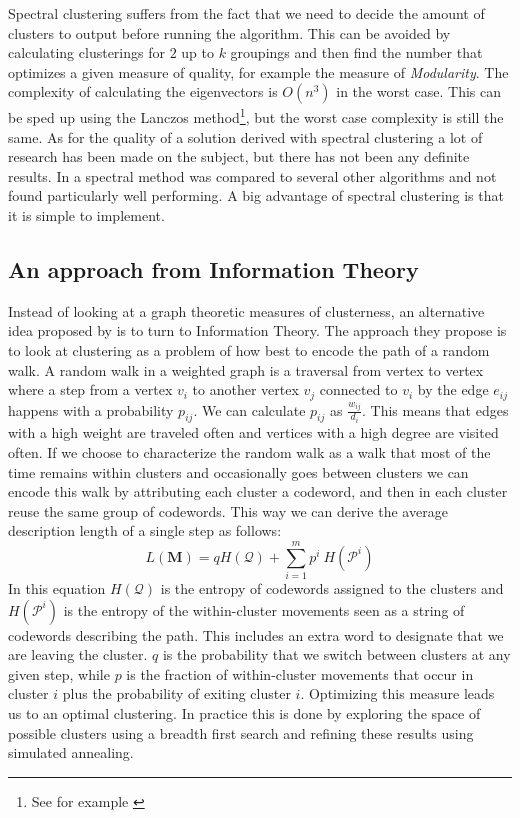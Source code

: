 Spectral clustering suffers from the fact that we need to decide the 
amount of clusters to output before running the algorithm. This can be 
avoided by calculating clusterings for $2$ up to $k$ groupings and then 
find the number that optimizes a given measure of quality, for example 
the measure of \emph{Modularity}. The complexity of calculating the 
eigenvectors is $O(n^3)$ in the worst case. This can be sped up using 
the Lanczos method\footnote{See for example \cite{golub1996}}, but the 
worst case complexity is still the same. As for the quality of a 
solution derived with spectral clustering a lot of research has been 
made on the subject, but there has not been any definite results. In 
\cite{lancichinetti2009} a spectral method was compared to several other 
algorithms and not found particularly well performing.  A big advantage 
of spectral clustering is that it is simple to implement.

\subsection{An approach from Information Theory}
Instead of looking at a graph theoretic measures of clusterness, an 
alternative idea proposed by \cite{rosvall2008} is to turn to 
Information Theory. The approach they propose is to look at clustering 
as a problem of how best to encode the path of a random walk. A random 
walk in a weighted graph is a traversal from vertex to vertex where a 
step from a vertex $v_i$ to another vertex $v_j$ connected to $v_i$ by 
the edge $e_{ij}$ happens with a probability $p_{ij}$. We can calculate 
$p_{ij}$ as $\frac{w_{ij}}{d_i}$. This means that edges with a high 
weight are traveled often and vertices with a high degree are visited 
often. If we choose to characterize the random walk as a walk that most 
of the time remains within clusters and occasionally goes between 
clusters we can encode this walk by attributing each cluster a codeword, 
and then in each cluster reuse the same group of codewords. This way we 
can derive the average description length of a single step as follows:
\begin{equation}
	L(\textbf{M}) = q H(\mathcal{Q}) + \sum_{i=1}^{m} p^i \
	H(\mathcal{P}^i)
\end{equation}
In this equation $H(\mathcal{Q})$ is the entropy of codewords assigned 
to the clusters and $H(\mathcal{P}^i)$ is the entropy of the 
within-cluster movements seen as a string of codewords describing the 
path. This includes an extra word to designate that we are leaving the 
cluster. $q$ is the probability that we switch between clusters at any 
given step, while $p$ is the fraction of within-cluster movements that 
occur in cluster $i$ plus the probability of exiting cluster $i$.  
Optimizing this measure leads us to an optimal clustering.  In practice 
this is done by exploring the space of possible clusters using a breadth 
first search and refining these results using simulated annealing.

